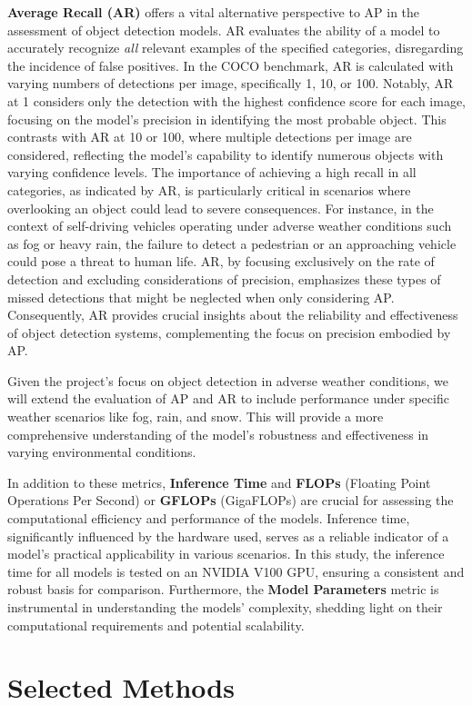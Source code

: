 \documentclass[report.tex]{subfiles}
\begin{document}
    \textbf{Average Recall (AR)} offers a vital alternative perspective to AP in the assessment of object detection models. AR evaluates the ability of a model to accurately recognize \textit{all} relevant examples of the specified categories, disregarding the incidence of false positives. In the COCO benchmark, AR is calculated with varying numbers of detections per image, specifically 1, 10, or 100. Notably, AR at 1 considers only the detection with the highest confidence score for each image, focusing on the model's precision in identifying the most probable object. This contrasts with AR at 10 or 100, where multiple detections per image are considered, reflecting the model's capability to identify numerous objects with varying confidence levels. The importance of achieving a high recall in all categories, as indicated by AR, is particularly critical in scenarios where overlooking an object could lead to severe consequences. For instance, in the context of self-driving vehicles operating under adverse weather conditions such as fog or heavy rain, the failure to detect a pedestrian or an approaching vehicle could pose a threat to human life. AR, by focusing exclusively on the rate of detection and excluding considerations of precision, emphasizes these types of missed detections that might be neglected when only considering AP. Consequently, AR provides crucial insights about the reliability and effectiveness of object detection systems, complementing the focus on precision embodied by AP.

    Given the project's focus on object detection in adverse weather conditions, we will extend the evaluation of AP and AR to include performance under specific weather scenarios like fog, rain, and snow. This will provide a more comprehensive understanding of the model's robustness and effectiveness in varying environmental conditions.

    In addition to these metrics, \textbf{Inference Time} and \textbf{FLOPs} (Floating Point Operations Per Second) or \textbf{GFLOPs} (GigaFLOPs) are crucial for assessing the computational efficiency and performance of the models. Inference time, significantly influenced by the hardware used, serves as a reliable indicator of a model's practical applicability in various scenarios. In this study, the inference time for all models is tested on an NVIDIA V100 GPU, ensuring a consistent and robust basis for comparison. Furthermore, the \textbf{Model Parameters} metric is instrumental in understanding the models' complexity, shedding light on their computational requirements and potential scalability.


    \section{Selected Methods}
\end{document}
